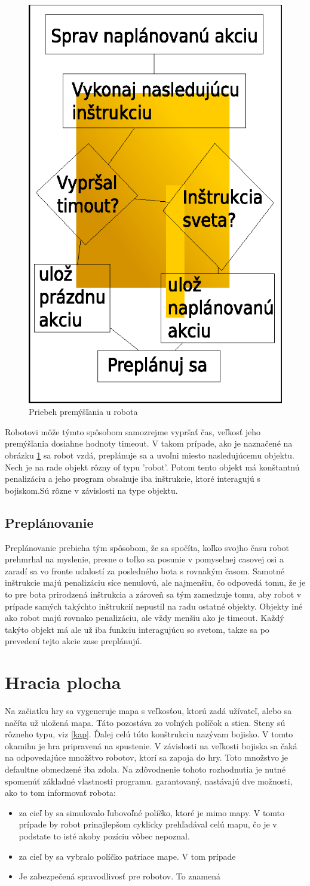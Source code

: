\begin{figure}
\centering
\includegraphics[totalheight=0.2\textheight,width=.2\textwidth]{thinking}
\caption {Priebeh premýšľania u robota}
\label{thinking}
\end{figure}
Robotovi môže týmto spôsobom samozrejme vypršať čas, veľkosť jeho premýšľania dosiahne hodnoty timeout.%
V takom prípade, ako je naznačené na obrázku \ref{thinking} sa robot vzdá, preplánuje sa a uvoľni miesto nasledujúcemu objektu. 
\newline
Nech je na rade objekt rôzny of typu 'robot'. Potom tento objekt má konštantnú penalizáciu a jeho program obsahuje iba inštrukcie, ktoré interagujú s bojiskom.Sú rôzne v závislosti na type objektu.
\subsection{Preplánovanie}
Preplánovanie prebieha tým spôsobom, že sa spočíta, koľko svojho času robot prehmrhal na myslenie, presne o toľko sa posunie v pomyselnej casovej osi a zaradí sa vo fronte udalostí za posledného bota s rovnakým časom. Samotné inštrukcie majú penalizáciu síce nenulovú, ale najmenšiu, čo odpovedá tomu, že je to pre bota prirodzená inštrukcia a zároveň sa tým zamedzuje tomu, aby robot v prípade samých takýchto inštrukcií nepustil na radu ostatné objekty. Objekty iné ako robot majú rovnako penalizáciu, ale vždy menšiu ako je timeout. Každý takýto objekt má ale už iba funkciu interagujúcu so svetom, takze sa po prevedení tejto akcie zase preplánujú.
\section{Hracia plocha} %
Na začiatku hry sa vygeneruje mapa s veľkosťou, ktorú zadá užívateľ, alebo sa načíta už uložená mapa. Táto pozostáva zo voľných políčok a stien. Steny sú rôzneho typu, viz \ref{kap}. Ďalej celú túto konštrukciu nazývam bojisko. V tomto okamihu je hra pripravená na spustenie. V závislosti na veľkosti bojiska sa čaká na odpovedajúce množštvo robotov, ktorí sa zapoja do hry. Toto množstvo je defaultne obmedzené iba zdola. Na zdôvodnenie tohoto rozhodnutia je nutné spomenúť základné vlastnosti programu. 
garantovaný, nastávajú dve možnosti, ako to tom informovať robota:\begin{itemize}
\item za cieľ by sa simulovalo ľubovoľné políčko, ktoré je mimo mapy. V tomto prípade by robot prinajlepšom cyklicky prehľadával celú mapu, čo je v podstate to isté akoby pozíciu vôbec nepoznal.
\item za cieľ by sa vybralo políčko patriace mape. V tom prípade 
\item Je zabezpečená spravodlivosť pre robotov. To znamená
\end{itemize}

